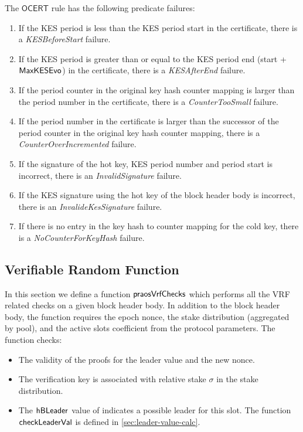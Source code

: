 The $\mathsf{OCERT}$ rule has the following predicate failures:
\begin{enumerate}
\item \label{itm:ocert-failures-1} If the KES period is less than the KES period start in the certificate,
  there is a \emph{KESBeforeStart} failure.
\item \label{itm:ocert-failures-2} If the KES period is greater than or equal to the KES period end (start +
  $\mathsf{MaxKESEvo}$) in the certificate, there is a \emph{KESAfterEnd} failure.
\item \label{itm:ocert-failures-3} If the period counter in the original key hash counter mapping is larger
  than the period number in the certificate, there is a \emph{CounterTooSmall}
  failure.
\item \label{itm:ocert-failures-4} If the period number in the certificate is larger than the successor of
  the period counter in the original key hash counter mapping, there is a
  \emph{CounterOverIncremented} failure.
\item \label{itm:ocert-failures-5} If the signature of the hot key, KES period number and period start is
  incorrect, there is an \emph{InvalidSignature} failure.
\item \label{itm:ocert-failures-6} If the KES signature using the hot key of the block header body is
  incorrect, there is an \emph{InvalideKesSignature} failure.
\item \label{itm:ocert-failures-7} If there is no entry in the key hash to counter mapping for the cold key,
  there is a \emph{NoCounterForKeyHash} failure.
\end{enumerate}

\subsection{Verifiable Random Function}
\label{sec:verif-rand-funct}

In this section we define a function $\mathsf{praosVrfChecks}$ which performs all the VRF related checks
on a given block header body.
In addition to the block header body, the function requires the epoch nonce,
the stake distribution (aggregated by pool), and the active slots coefficient from the protocol
parameters. The function checks:

\begin{itemize}
\item The validity of the proofs for the leader value and the new nonce.
\item The verification key is associated with relative stake $\sigma$ in the stake distribution.
\item The $\mathsf{hBLeader}$ value of  indicates a possible leader for
  this slot. The function $\mathsf{checkLeaderVal}$ is defined in \ref{sec:leader-value-calc}.
\end{itemize}

